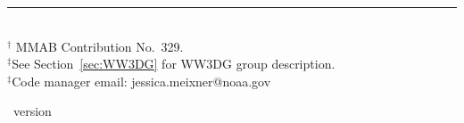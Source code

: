 \vfill

\noindent \rule{140mm}{0.5mm} \\
{\small $^\dag$ MMAB Contribution No.~329. \\
$^\ddag$See Section~\ref{sec:WW3DG} for WW3DG group description.\\
$^\ddag$Code manager email: jessica.meixner@noaa.gov}

\bpage

\pb

         { \hspace{20.5mm} \ws\ version \WWver}
\pagestyle{myheadings}
\setcounter{page}{1}
\tableofcontents

\pb
\pagestyle{empty}
\bpagea

\pb
\pagestyle{myheadings}



